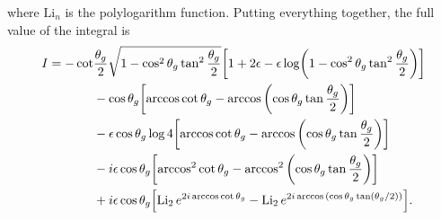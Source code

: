 \documentclass[11pt,twoside,reqno]{amsart}
\theoremstyle{plain}
\theoremstyle{remark}
\theoremstyle{definition}
\theoremstyle{remark}
\theoremstyle{definition}
\theoremstyle{definition}
\newcommand{\Li}{\mathrm{Li}}
\begin{document}
	where $\Li_n$ is the polylogarithm function. Putting everything together, the full value of the integral is
	\begin{equation}
	\begin{aligned}
		I = -\cot&\frac{\theta_g}{2}\sqrt{1 - \cos^2\theta_g \tan^2\frac{\theta_g}{2}} \qty[1 + 2\epsilon - \epsilon\log(1 - \cos^2\theta_g \tan^2\frac{\theta_g}{2})] \\
			&-\cos\theta_g \qty[\arccos\cot\theta_g - \arccos \qty(\cos\theta_g \tan\frac{\theta_g}{2})] \\
			&- \epsilon \cos\theta_g \log 4 \qty[\arccos\cot\theta_g - \arccos \qty(\cos\theta_g \tan\frac{\theta_g}{2})] \\
			&- i \epsilon \cos\theta_g \qty[\arccos^2\cot\theta_g - \arccos^2 \qty(\cos\theta_g \tan\frac{\theta_g}{2})] \\
			&+ i\epsilon\cos\theta_g \qty[\Li_2\,e^{2i\arccos\cot\theta_g} - \Li_2\,e^{2i\arccos\qty(\cos\theta_g\tan(\theta_g/2))}].
	\end{aligned}
	\end{equation}




\end{document}
